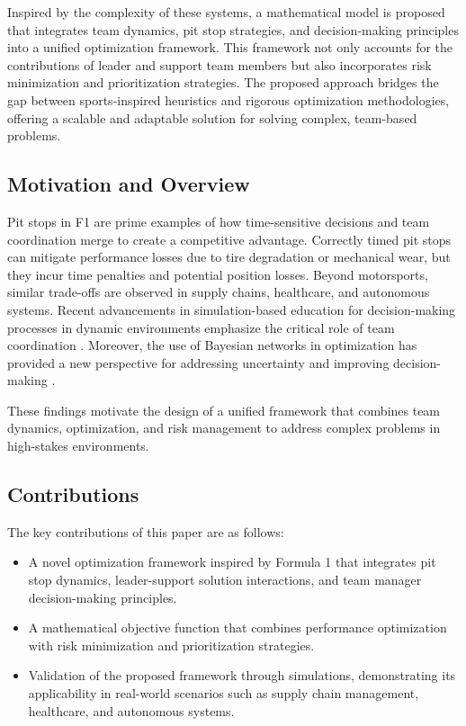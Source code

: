\documentclass[preprint,12pt]{elsarticle}
\begin{document}
Inspired by the complexity of these systems, a mathematical model is proposed that integrates team dynamics, pit stop strategies, and decision-making principles into a unified optimization framework. This framework not only accounts for the contributions of leader and support team members but also incorporates risk minimization and prioritization strategies. The proposed approach bridges the gap between sports-inspired heuristics and rigorous optimization methodologies, offering a scalable and adaptable solution for solving complex, team-based problems.

\subsection{Motivation and Overview}
Pit stops in F1 are prime examples of how time-sensitive decisions and team coordination merge to create a competitive advantage. Correctly timed pit stops can mitigate performance losses due to tire degradation or mechanical wear, but they incur time penalties and potential position losses. Beyond motorsports, similar trade-offs are observed in supply chains, healthcare, and autonomous systems. Recent advancements in simulation-based education for decision-making processes in dynamic environments emphasize the critical role of team coordination \cite{evans2021incorporating}. Moreover, the use of Bayesian networks in optimization has provided a new perspective for addressing uncertainty and improving decision-making \cite{peng2024active}.

These findings motivate the design of a unified framework that combines team dynamics, optimization, and risk management to address complex problems in high-stakes environments.

\subsection{Contributions}
The key contributions of this paper are as follows:
\begin{itemize}
    \item A novel optimization framework inspired by Formula 1 that integrates pit stop dynamics, leader-support solution interactions, and team manager decision-making principles.
    \item A mathematical objective function that combines performance optimization with risk minimization and prioritization strategies.
    \item Validation of the proposed framework through simulations, demonstrating its applicability in real-world scenarios such as supply chain management, healthcare, and autonomous systems.
\end{itemize}
\end{document}
